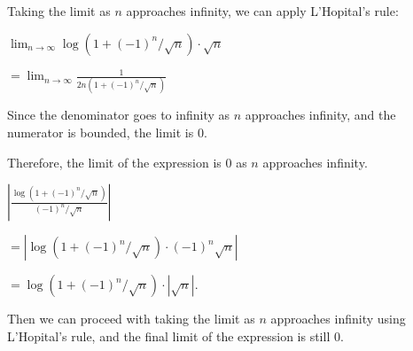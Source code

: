 \documentclass[12pt]{memoir}
\begin{document}
\begin{ptcb}
Taking the limit as $n$ approaches infinity, we can apply L'Hopital's rule:

$\lim_{n \to \infty} \log(1+(-1)^n/\sqrt{n}) \cdot \sqrt{n}$

$= \lim_{n \to \infty} \frac{1}{2n(1+(-1)^n/\sqrt{n})}$

Since the denominator goes to infinity as $n$ approaches infinity, and the numerator is bounded, the limit is 0.

Therefore, the limit of the expression is 0 as $n$ approaches infinity.

$\left|\frac{\log(1+(-1)^n/\sqrt{n})}{(-1)^n/\sqrt{n}}\right|$

$= \left|\log(1+(-1)^n/\sqrt{n}) \cdot (-1)^n \sqrt{n}\right|$

$= \log(1+(-1)^n/\sqrt{n}) \cdot \left|\sqrt{n}\right|$.

Then we can proceed with taking the limit as $n$ approaches infinity using L'Hopital's rule, and the final limit of the expression is still 0.
\end{ptcb}
\end{document}
